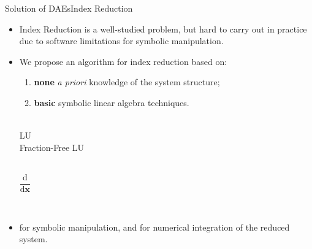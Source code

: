 \begin{frame}{Solution of \aclp{DAE}}{Index Reduction}
  \begin{itemize}
    \item Index Reduction is a well-studied problem, but hard to carry out in practice due to software limitations for symbolic manipulation.
    \\[1.0em]
    \item We propose an algorithm for index reduction based on:
    \\[0.5em]
    \begin{enumerate}
      \item \textbf{none} \emph{a priori} knowledge of the system structure;
      \\[0.5em]
      \item \textbf{basic} symbolic linear algebra techniques.
    \end{enumerate}
    \begin{center}\begin{minipage}[t]{0.30\textwidth}\begin{block}{}
      \centering
       \\[0.5em]
      LU \\ Fraction-Free LU \vspace*{0.15cm}
    \end{block}\end{minipage}
    \hspace*{2cm}
    \begin{minipage}[t]{0.30\textwidth}\begin{block}{}
      \centering
       \\[0.75em]
      $\dfrac{\text{d}}{\text{d}\textbf{x}}$ \vspace*{0.15cm}
    \end{block}\end{minipage} \\[1.75em] \end{center}
    \item \Maple{} for symbolic manipulation, and \Matlab{} for numerical integration of the reduced system.
  \end{itemize}
\end{frame}

